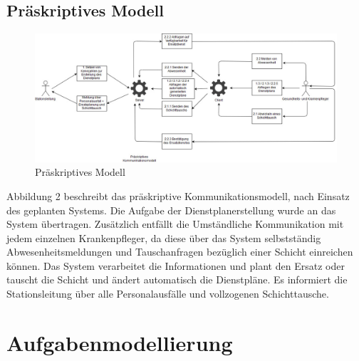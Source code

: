 \documentclass[10pt,a4paper]{article}
\begin{document}
\subsection{Präskriptives Modell}
\begin{figure}[H]
\includegraphics[scale=0.3]{Bilder/PraeskriptivesKommunikationsmodell.jpg}{\centering}
\caption{Präskriptives Modell}
\end{figure}
Abbildung 2 beschreibt das präskriptive Kommunikationsmodell, nach Einsatz des geplanten Systems. Die Aufgabe der Dienstplanerstellung wurde an das System übertragen. Zusätzlich entfällt die Umständliche Kommunikation mit jedem einzelnen Krankenpfleger, da diese über das System selbstständig Abwesenheitsmeldungen und Tauschanfragen bezüglich einer Schicht einreichen können. Das System verarbeitet die Informationen und plant den Ersatz oder tauscht die Schicht und ändert automatisch die Dienstpläne. Es informiert die Stationsleitung über alle Personalausfälle und vollzogenen Schichttausche.
\section{Aufgabenmodellierung}
\end{document}
